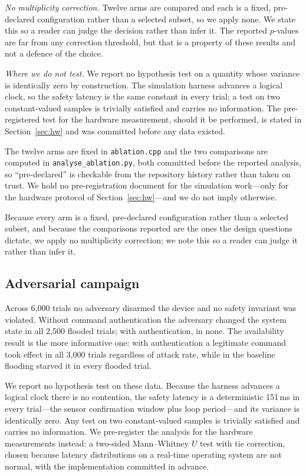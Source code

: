 \emph{No multiplicity correction.} Twelve arms are compared and each is a fixed, pre-declared
configuration rather than a selected subset, so we apply none. We state this so a reader can judge
the decision rather than infer it. The reported $p$-values are far from any correction threshold,
but that is a property of these results and not a defence of the choice.

\emph{Where we do not test.} We report no hypothesis test on a quantity whose variance is
identically zero by construction. The simulation harness advances a logical clock, so the safety
latency is the same constant in every trial; a test on two constant-valued samples is trivially
satisfied and carries no information. The pre-registered test for the hardware measurement,
should it be performed, is stated in Section~\ref{sec:hw} and was committed before any data
existed.

The twelve arms are fixed in \texttt{ablation.cpp} and the two comparisons are computed in
\texttt{analyse\_ablation.py}, both committed before the reported analysis, so ``pre-declared'' is
checkable from the repository history rather than taken on trust. We hold no pre-registration
document for the simulation work---only for the hardware protocol of Section~\ref{sec:hw}---and we
do not imply otherwise.

Because every arm is a fixed, pre-declared configuration rather than a selected subset, and
because the comparisons reported are the ones the design questions dictate, we apply no
multiplicity correction; we note this so a reader can judge it rather than infer it.

\subsection{Adversarial campaign}

Across 6{,}000 trials no adversary disarmed the device and no safety invariant was violated.
Without command authentication the adversary changed the system state in all 2{,}500 flooded
trials; with authentication, in none. The availability result is the more informative one: with
authentication a legitimate command took effect in all 3{,}000 trials regardless of attack rate,
while in the baseline flooding starved it in every flooded trial.

We report no hypothesis test on these data. Because the harness advances a logical clock there
is no contention, the safety latency is a deterministic 151\,ms in every trial---the sensor
confirmation window plus loop period---and its variance is identically zero. Any test on two
constant-valued samples is trivially satisfied and carries no information. We pre-register the
analysis for the hardware measurements instead: a two-sided Mann--Whitney $U$ test with tie
correction, chosen because latency distributions on a real-time operating system are not normal,
with the implementation committed in advance.

